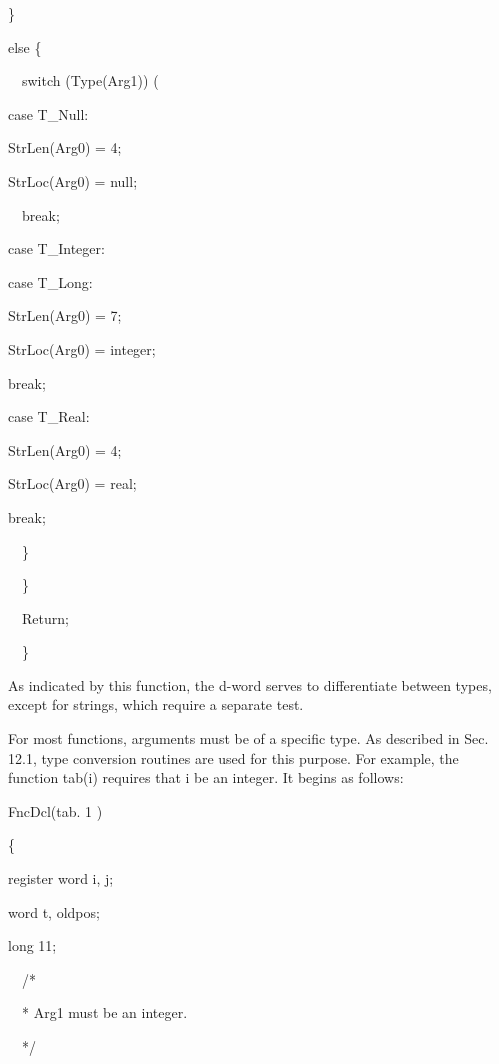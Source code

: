 {\ttfamily\mdseries
\}}

{\ttfamily\mdseries
else \{}

{\ttfamily\mdseries
\ \ switch (Type(Arg1)) (}

{\ttfamily\mdseries
case T\_Null:}

{\ttfamily\mdseries
StrLen(Arg0) = 4;}

{\ttfamily\mdseries
StrLoc(Arg0) = {\textquotedbl}null{\textquotedbl};}

{\ttfamily\mdseries
\ \ break;}

{\ttfamily\mdseries
case T\_Integer:}

{\ttfamily\mdseries
case T\_Long:}

{\ttfamily\mdseries
StrLen(Arg0) = 7;}

{\ttfamily\mdseries
StrLoc(Arg0) = {\textquotedbl}integer{\textquotedbl};}

{\ttfamily\mdseries
break;}

{\ttfamily\mdseries
case T\_Real:}

{\ttfamily\mdseries
StrLen(Arg0) = 4;}

{\ttfamily\mdseries
StrLoc(Arg0) = {\textquotedbl}real{\textquotedbl};}

{\ttfamily\mdseries
break;}

{\ttfamily\mdseries
\ \ \}}

{\ttfamily\mdseries
\ \ \}}

{\ttfamily\mdseries
\ \ Return;}

{\ttfamily\mdseries
\ \ \}}


As indicated by this function, the d-word serves to differentiate
between types, except for strings, which require a separate test.


For most functions, arguments must be of a specific type. As described
in Sec. 12.1, type conversion routines are used for this purpose. For
example, the function tab(i) requires that i be an integer. It begins
as follows:

{\ttfamily\mdseries
FncDcl(tab. 1 )}

{\ttfamily\mdseries
\{}

{\ttfamily\mdseries
register word i, j;}

{\ttfamily\mdseries
word t, oldpos;}

{\ttfamily\mdseries
long 11;}

{\ttfamily\mdseries
\ \ /*}

{\ttfamily\mdseries
\ \ * Arg1 must be an integer.}

{\ttfamily\mdseries
\ \ */}

